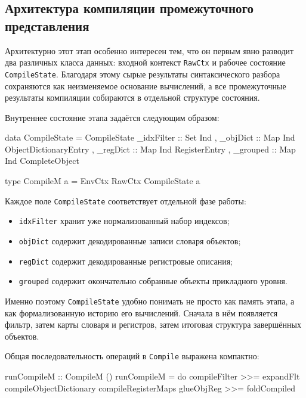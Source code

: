 \documentclass[a4paper,12pt]{article}
\begin{document}
\subsection{Архитектура компиляции промежуточного представления}

Архитектурно этот этап особенно интересен тем, что он первым явно разводит два
различных класса данных: входной контекст \texttt{RawCtx} и рабочее состояние
\texttt{CompileState}. Благодаря этому сырые результаты синтаксического разбора
сохраняются как неизменяемое основание вычислений, а все промежуточные результаты
компиляции собираются в отдельной структуре состояния.

Внутреннее состояние этапа задаётся следующим образом:

\begin{flushleft}
\label{lst:compile-state}
\begin{MyCodes}
data CompileState = CompileState
  { _idxFilter :: Set Ind
  , _objDict   :: Map Ind ObjectDictionaryEntry
  , _regDict   :: Map Ind RegisterEntry
  , _grouped   :: Map Ind CompleteObject
  }

type CompileM a = EnvCtx RawCtx CompileState a
\end{MyCodes}
\end{flushleft}

Каждое поле \texttt{CompileState} соответствует отдельной фазе работы:
\begin{itemize}
  \item \texttt{idxFilter} хранит уже нормализованный набор индексов;
  \item \texttt{objDict} содержит декодированные записи словаря объектов;
  \item \texttt{regDict} содержит декодированные регистровые описания;
  \item \texttt{grouped} содержит окончательно собранные объекты прикладного уровня.
\end{itemize}

Именно поэтому \texttt{CompileState} удобно понимать не просто как память этапа, а как
формализованную историю его вычислений. Сначала в нём появляется фильтр, затем карты
словаря и регистров, затем итоговая структура завершённых объектов.

Общая последовательность операций в \texttt{Compile} выражена компактно:

\begin{flushleft}
\label{lst:compile-main}
\begin{MyCodes}
runCompileM :: CompileM ()
runCompileM = do
  compileFilter >>= expandFlt
  compileObjectDictionary
  compileRegisterMaps
  glueObjReg >>= foldCompiled
\end{MyCodes}
\end{flushleft}
\end{document}
